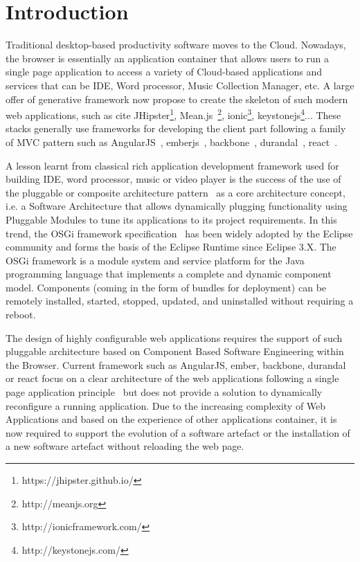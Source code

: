 \section{Introduction}


Traditional desktop-based productivity software moves to the Cloud. Nowadays, the browser is essentially an application container that allows users to run a single page application to  access a variety of Cloud-based applications and services that can be IDE, Word processor, Music Collection Manager, etc. A large offer of generative framework now propose to create the skeleton of such modern web applications, such as cite JHipster\footnote{https://jhipster.github.io/}, Mean.js~\footnote{http://meanjs.org}, ionic\footnote{http://ionicframework.com/}, keystonejs\footnote{http://keystonejs.com/}... These stacks generally use frameworks for developing the client part following a family of MVC pattern such as AngularJS~\cite{green2013angularjs}, emberjs~\cite{cravens2014building}, backbone~\cite{osmani2013developing}, durandal~\cite{monteiro2014learning}, react~\cite{fedosejev2015react}.  

A lesson learnt from classical rich application development framework used for building IDE, word processor, music or video player is the success of the use of the pluggable or composite architecture pattern~\cite{115158,schmidt2013pattern} as a core architecture concept,  i.e. a Software Architecture that allows dynamically plugging functionality using Pluggable Modules to tune its applications to its project requirements. In this trend, the OSGi framework specification~\cite{hall2011osgi} has been widely adopted by the Eclipse community and forms the basis of the Eclipse Runtime since Eclipse 3.X. The OSGi framework is a module system and service platform for the Java programming language that implements a complete and dynamic component model. Components (coming in the form of bundles for deployment) can be remotely installed, started, stopped, updated, and uninstalled without requiring a reboot.  

The design of highly configurable web applications requires the support of such pluggable architecture based on Component Based Software Engineering within the Browser. Current framework such as AngularJS, ember, backbone, durandal or react focus on a clear architecture of the web applications following a single page application principle~\cite{monteiro2014learning} but does not provide a solution to dynamically reconfigure a running application. Due to the increasing complexity of Web Applications and based on the experience of other applications container, it is now required to support the evolution of a software artefact or the installation of a new software artefact without reloading the web page.  

